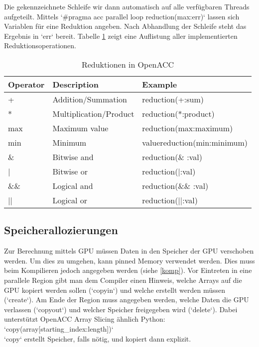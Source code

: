 			Die gekennzeichnete Schleife wir dann automatisch auf alle verfügbaren Threads aufgeteilt.
			Mittels \li`#pragma  acc parallel loop reduction(max:err)` lassen sich Variablen für eine Reduktion angeben. Nach Abhandlung der Schleife steht das Ergebnis in \li`err` bereit. Tabelle \ref{oaccred} zeigt eine Auflistung aller implementierten Reduktionsoperationen.
	
			\begin{table}[h]
			\centering
			\begin{tabular}{|l|l|l|}
				\toprule
				\textbf{Operator} & \textbf{Description} & \textbf{Example} \\\hline\hline
				+ & Addition/Summation & reduction(+:sum) \\\hline
				* & Multiplication/Product & reduction(*:product) \\\hline
		 		max & Maximum value & reduction(max:maximum) \\\hline
				min & Minimum & valuereduction(min:minimum) \\\hline
				\& & Bitwise and & reduction(\& :val) \\\hline
				| & Bitwise or & reduction(|:val) \\\hline
				\&\& & Logical and & reduction(\&\& :val) \\\hline
				|| & Logical or & reduction(||:val) \\\bottomrule
			\end{tabular}
			\caption{Reduktionen in OpenACC}
			\label{oaccred}
			\end{table}
		
			\subsection{Speicherallozierungen}
			Zur Berechnung mittels GPU müssen Daten in den Speicher der GPU verschoben werden. Um dies zu umgehen, kann pinned Memory verwendet werden. Dies muss beim Kompilieren jedoch angegeben werden (siehe \ref{komp}). Vor Eintreten in eine parallele Region gibt man dem Compiler einen Hinweis, welche Arrays auf die GPU kopiert werden sollen (\li`copyin`) und welche erstellt werden müssen (\li`create`). Am Ende der Region muss angegeben werden, welche Daten die GPU verlassen (\li`copyout`) und welcher Speicher freigegeben wird (\li`delete`). Dabei unterstützt OpenACC Array Slicing ähnlich Python:\\
			\li`copy(array[starting_index:length])`\\
			\li`copy` erstellt Speicher, falls nötig, und kopiert dann explizit.
			
